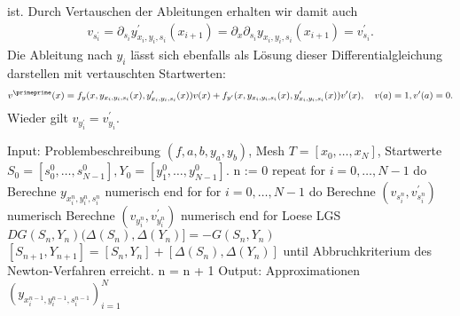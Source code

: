 \begin{solution}
ist. Durch Vertauschen der Ableitungen erhalten wir damit auch
\begin{align*}
  v_{s^{\prime}_i} = \partial_{s_i}y^{\prime}_{x_i,y_i,s_i}(x_{i+1})
  = \partial_x \partial_{s_i}y_{x_i,y_i,s_i}(x_{i+1}) = v_{s_i}^{\prime}.
\end{align*}
Die Ableitung nach $y_i$ lässt sich ebenfalls als Lösung dieser Differentialgleichung
darstellen mit vertauschten Startwerten:
\begin{align*}
  v^{\primeprime}(x) = f_y(x,y_{x_i,y_i,s_i}(x),y_{x_i,y_i,s_i}^{\prime}(x))v(x)
  + f_{y^{\prime}}(x,y_{x_i,y_i,s_i}(x),y_{x_i,y_i,s_i}^{\prime}(x))v^{\prime}(x), \quad v(a) = 1, v^{\prime}(a) = 0.
\end{align*}
Wieder gilt $v_{y^{\prime}_i} = v_{y_i}^{\prime}$.
  \begin{algorithm}[caption={Mehrzielverfahren.}, label={alg1}]
   Input: Problembeschreibung $(f,a,b,y_a,y_b)$, Mesh $T = [x_0,\dots,x_N]$, Startwerte $S_0 = [s_0^0,\dots,s_{N-1}^0], Y_0 = [y_1^0,\dots,y_{N-1}^0]$.
   n := 0
   repeat
      for $i = 0,\dots,N-1$ do
        Berechne $y_{x_i^n,y_i^n,s_i^n}$ numerisch
      end for
      for $i = 0,\dots,N-1$ do
        Berechne $(v_{s_i^n},v_{s_i^n}^{\prime})$ numerisch
        Berechne $(v_{y_i^n},v_{y_i^n}^{\prime})$ numerisch
      end for
      Loese LGS $DG(S_n,Y_n)(\Delta(S_n),\Delta(Y_n)] = -G(S_n,Y_n)$
      $[S_{n+1},Y_{n+1}] = [S_n,Y_n] + [\Delta(S_n),\Delta(Y_n)]$
   until Abbruchkriterium des Newton-Verfahren erreicht.
   n = n + 1
   Output: Approximationen $(y_{x_i^{n-1},y_i^{n-1},s_i^{n-1}})_{i=1}^N$
  \end{algorithm}
\end{solution}
